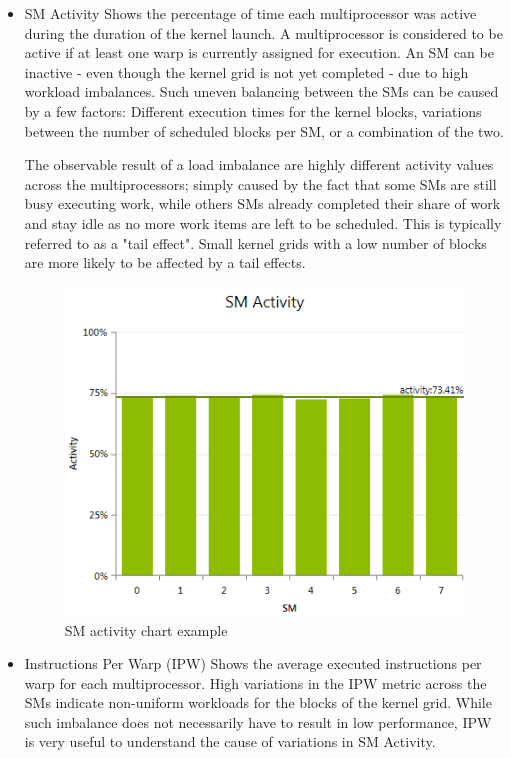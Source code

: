 \documentclass[oneside,openright,12pt,final,en]{mgr}
\begin{document}
\begin{itemize}
	\item SM Activity
	Shows the percentage of time each multiprocessor was active during the duration of the kernel launch. A multiprocessor is considered to be active if at least one warp is currently assigned for execution. An SM can be inactive - even though the kernel grid is not yet completed - due to high workload imbalances. Such uneven balancing between the SMs can be caused by a few factors: Different execution times for the kernel blocks, variations between the number of scheduled blocks per SM, or a combination of the two.
	
	The observable result of a load imbalance are highly different activity values across the multiprocessors; simply caused by the fact that some SMs are still busy executing work, while others SMs already completed their share of work and stay idle as no more work items are left to be scheduled. This is typically referred to as a "tail effect". Small kernel grids with a low number of blocks are more likely to be affected by a tail effects.
	
		\begin{figure}[h!]
		\centering
		\includegraphics{InstructionStatisticsChartSmActivity}
		\caption{SM activity chart example}
	\end{figure}
	
	\item Instructions Per Warp (IPW)
	Shows the average executed instructions per warp for each multiprocessor. High variations in the IPW metric across the SMs indicate non-uniform workloads for the blocks of the kernel grid. While such imbalance does not necessarily have to result in low performance, IPW is very useful to understand the cause of variations in SM Activity.
	

\end{itemize}
\end{document}
